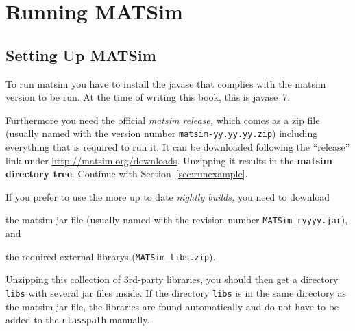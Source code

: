
\section{Running MATSim}
\label{sec:runningmatsim}

\subsection{Setting Up MATSim}
\label{sec:settingUpMatsim}

To run \gls{matsim} you have to install the \gls{javase} that complies with the \gls{matsim} version to be run. At the time of writing this book, this is \gls{javase}~7.

Furthermore you need the official \emph{\gls{matsim} release,} which comes as a zip file (usually named with the version number \lstinline|matsim-yy.yy.yy.zip|) including everything that is required to run it. It can be downloaded following the ``release'' link under \url{http://matsim.org/downloads}.
Unzipping it results in the \textbf{\gls{matsim} directory tree}.   Continue with Section~\ref{sec:runexample}.

If you prefer to use the more up to date \emph{nightly builds,} you need to download
\begin{compactitem}
\item the \gls{matsim} \gls{jar} file (usually named with the revision number \lstinline|MATSim_ryyyy.jar|), and

\item the required external \glspl{library} (\lstinline|MATSim_libs.zip|). 

Unzipping this collection of 3rd-party libraries, you should then get a directory \lstinline|libs| with several \gls{jar} files inside. If the directory \lstinline|libs| is in the same directory as the \gls{matsim} \gls{jar} file, the libraries are found automatically and do not have to be added to the \lstinline|classpath| manually.
\end{compactitem}

